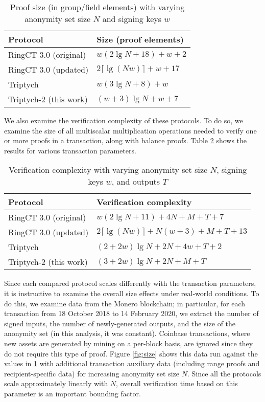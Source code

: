 \documentclass{article}
\theoremstyle{definition}
\begin{document}
\begin{table}
\centering
\begin{tabular}{|ll|}
\hline
Protocol & Size (proof elements) \\
\hline
RingCT 3.0 (original) \cite{rct3} & $w(2 \lg N + 18) + w + 2$ \\
RingCT 3.0 (updated) \cite{rct3} & $2\lceil \lg(Nw) \rceil + w + 17$ \\
Triptych \cite{triptych} & $w(3 \lg N + 8) + w$ \\
Triptych-2 (this work) & $(w + 3)\lg N + w + 7$ \\
\hline
\end{tabular}
\caption{Proof size (in group/field elements) with varying anonymity set size $N$ and signing keys $w$}
\label{table:size}
\end{table}

We also examine the verification complexity of these protocols.
To do so, we examine the size of all multiscalar multiplication operations needed to verify one or more proofs in a transaction, along with balance proofs.
Table \ref{table:time} shows the results for various transaction parameters.

\begin{table}
\centering
\begin{tabular}{|ll|}
\hline
Protocol & Verification complexity \\
\hline
RingCT 3.0 (original) \cite{rct3} & $w(2\lg N + 11) + 4N + M + T + 7$ \\
RingCT 3.0 (updated) \cite{rct3} & $2\lceil \lg(Nw) \rceil + N(w + 3) + M + T + 13$ \\
Triptych \cite{triptych} & $(2 + 2w)\lg N + 2N + 4w + T + 2$ \\
Triptych-2 (this work) & $(3 + 2w)\lg N + 2N + M + T$ \\
\hline
\end{tabular}
\caption{Verification complexity with varying anonymity set size $N$, signing keys $w$, and outputs $T$}
\label{table:time}
\end{table}

Since each compared protocol scales differently with the transaction parameters, it is instructive to examine the overall size effects under real-world conditions.
To do this, we examine data from the Monero blockchain; in particular, for each transaction from 18 October 2018 to 14 February 2020, we extract the number of signed inputs, the number of newly-generated outputs, and the size of the anonymity set (in this analysis, it was constant).
Coinbase transactions, where new assets are generated by mining on a per-block basis, are ignored since they do not require this type of proof.
Figure \ref{fig:size} shows this data run against the values in \ref{table:size} with additional transaction auxiliary data (including range proofs and recipient-specific data) for increasing anonymity set size $N$.
Since all the protocols scale approximately linearly with $N$, overall verification time based on this parameter is an important bounding factor.
\end{document}

